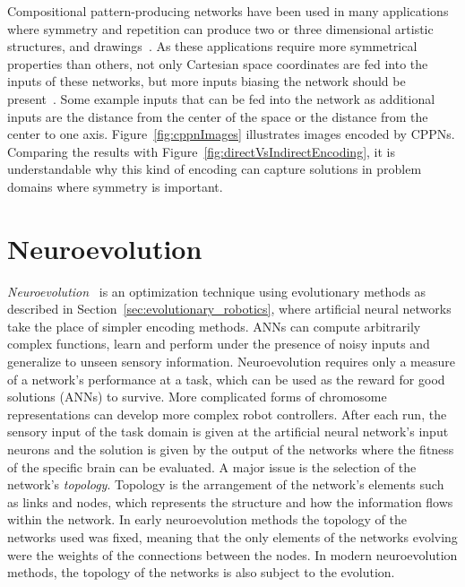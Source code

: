 
Compositional pattern-producing networks have been used in many applications where symmetry and repetition can produce two or three dimensional artistic structures\footnotemark[2], and drawings\footnotemark[1]~\citep{secretan2008picbreeder}. As these applications require more symmetrical properties than others, not only Cartesian space coordinates are fed into the inputs of these networks, but more inputs biasing the network should be present~\citep{secretan2008picbreeder}. Some example inputs that can be fed into the network as additional inputs are the distance from the center of the space or the distance from the center to one axis. Figure~\ref{fig:cppnImages} illustrates images encoded by CPPNs. Comparing the results with Figure~\ref{fig:directVsIndirectEncoding}, it is understandable why this kind of encoding can capture solutions in problem domains where symmetry is important.




\section{Neuroevolution}

\emph{Neuroevolution}~\citep{yao1997new} is an optimization technique using evolutionary methods as described in Section~\ref{sec:evolutionary_robotics}, where artificial neural networks take the place of simpler encoding methods. ANNs can compute arbitrarily complex functions, learn and perform under the presence of noisy inputs and generalize to unseen sensory information. Neuroevolution requires only a measure of a network's performance at a task, which can be used as the reward for good solutions (ANNs) to survive. More complicated forms of chromosome representations can develop more complex robot controllers. After each run, the sensory input of the task domain is given at the artificial neural network's input neurons and the solution is given by the output of the networks where the fitness of the specific brain can be evaluated. A major issue is the selection of the network's \emph{topology}. Topology is the arrangement of the network's elements such as links and nodes, which represents the structure and how the information flows within the network. In early neuroevolution methods the topology of the networks used was fixed, meaning that the only elements of the networks evolving were the weights of the connections between the nodes. In modern neuroevolution methods, the topology of the networks is also subject to the evolution.

